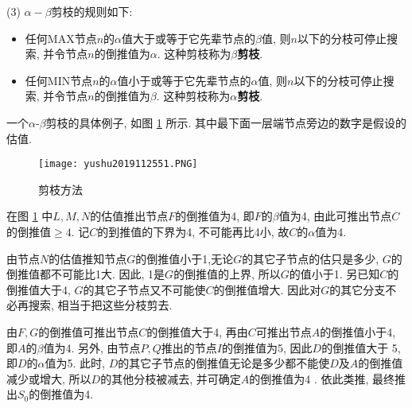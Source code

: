 (3) $\alpha-\beta$剪枝的规则如下:
    \begin{itemize}
    \item 任何MAX节点$n$的$\alpha$值大于或等于它先辈节点的$\beta$值, 则$n$以下的分枝可停止搜索, 并令节点$n$的倒推值为$\alpha$. 这种剪枝称为\textbf{$\beta$剪枝}.
    \item 任何MIN节点$n$的$\alpha$值小于或等于它先辈节点的$\alpha$值, 则$n$以下的分枝可停止搜索, 并令节点$n$的倒推值为$\beta$. 这种剪枝称为\textbf{$\alpha$剪枝}.
    \end{itemize}
\begin{example}
    一个$\alpha$-$\beta$剪枝的具体例子, 如图 \ref{AI32fig51} 所示. 其中最下面一层端节点旁边的数字是假设的估值.
\end{example}
\begin{figure}[H]
    \centering
    \texttt{[image: yushu2019112551.PNG]}
    \caption{剪枝方法}
    \label{AI32fig51}
\end{figure}
在图 \ref{AI32fig51} 中$L,M,N$的估值推出节点$F$的倒推值为4, 即$F$的$\beta$值为4, 由此可推出节点$C$的倒推值$\geq 4$.
记$C$的到推值的下界为4, 不可能再比4小, 故$C$的$\alpha$值为4.

由节点$N$的估值推知节点$G$的倒推值小于1,无论$G$的其它子节点的估只是多少, $G$的倒推值都不可能比1大.
因此, 1是$G$的倒推值的上界, 所以$G$的值小于1.
另已知$C$的倒推值大于4, $G$的其它子节点又不可能使$C$的倒推值增大. 因此对$G$的其它分支不必再搜索, 相当于把这些分枝剪去.

由$F,G$的倒推值可推出节点$C$的倒推值大于4, 再由$C$可推出节点$A$的倒推值小于4, 即$A$的$\beta$值为4.
另外, 由节点$P,Q$推出的节点$I$的倒推值为5, 因此$D$的倒推值大于 5, 即$D$的$\alpha$值为5.
此时, $D$的其它子节点的倒推值无论是多少都不能使$D$及$A$的倒推值减少或增大, 所以$D$的其他分枝被减去, 并可确定$A$的倒推值为4 .
依此类推, 最终推出$S_0$的倒推值为4.

